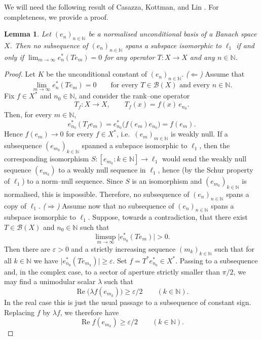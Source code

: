 \documentclass[11pt]{amsart}
\theoremstyle{plain}
\newtheorem{lemma}[theorem]{Lemma}
\theoremstyle{definition}
\numberwithin{equation}{section}
\newcommand{\N}{\mathbb{N}}
\renewcommand{\ge}{\geqslant}
\begin{document}
We will need the following result of Casazza, Kottman, and Lin \cite[Lemma 2]{CKL1976}. For completeness, we provide a proof.

\begin{lemma}\label{lmm: sym-basis-affected}
    Let $(e_n)_{n \in \N}$ be a normalised unconditional basis of a Banach space $X$. Then no subsequence of $(e_n)_{n \in \N}$ spans a subspace isomorphic to $\ell_1$ if and only if $\lim_{m \to \infty} e_n^* (Te_m) = 0$  for any operator $T \colon  X \to X$ and any $n \in \N$.
\end{lemma}
\begin{proof}
Let $K$ be the unconditional constant of $(e_n)_{n\in\N}$.
    \medskip
\noindent\emph{($\Leftarrow$)} Assume that
\[
    \lim_{m\to\infty} e_n^*(T e_m)=0
    \qquad\text{for every }T\in\mathcal B(X)\text{ and every }n\in\N.
\]
Fix $f\in X^*$ and $n_0\in\N$, and consider the rank--one operator
\[
    T_f \colon X\to X, \qquad T_f(x)= f(x)\,e_{n_0}.
\]
Then, for every $m\in\N$,
\[
    e_{n_0}^*(T_f e_m)= e_{n_0}^*\bigl(f(e_m)e_{n_0}\bigr)= f(e_m).
\]
Hence $f(e_m)\to 0$ for every $f\in X^*$, i.e.\ $(e_m)_{m \in \N}$ is weakly null. If a subsequence $(e_{m_k})_{k \in \N}$ spanned a subspace isomorphic to $\ell_1$, then the corresponding isomorphism $S\colon [e_{m_k}: k \in \N] \to \ell_1$ would send the weakly
null sequence $(e_{m_k})$ to a weakly null sequence in $\ell_1$, hence (by the
Schur property of $\ell_1$) to a norm--null sequence. Since $S$ is an
isomorphism and $(e_{m_k})_{k \in \N}$ is normalised, this is impossible. Therefore, no
subsequence of $(e_n)_{n \in \N}$ spans a copy of $\ell_1$.
\medskip
\noindent\emph{($\Rightarrow$)} Assume now that no subsequence of $(e_n)_{n \in \N}$ spans
a subspace isomorphic to $\ell_1$. Suppose, towards a contradiction, that there
exist $T\in\mathcal B(X)$ and $n_0\in\N$ such that
\[
    \limsup_{m\to\infty}\bigl|e_{n_0}^*(T e_m)\bigr|>0.
\]
Then there are $\varepsilon>0$ and a strictly increasing sequence $(m_k)_{k \in \N}$ such
that for all $k\in\N$ we have
\(
    \bigl|e_{n_0}^*(T e_{m_k})\bigr|\ge \varepsilon.
\)
Set $f=T^*e_{n_0}^*\in X^*$. Passing to a subsequence and, in the complex case, to a sector of aperture strictly smaller than $\pi/2$, we may find a unimodular scalar $\lambda$ such that
\[
    \operatorname{Re}\bigl(\lambda f(e_{m_k})\bigr)\ge \varepsilon/2
    \qquad(k\in\N).
\]
In the real case this is just the usual passage to a subsequence of constant sign. Replacing $f$ by $\lambda f$, we therefore have
\[
    \operatorname{Re} f(e_{m_k})\ge \varepsilon/2
    \qquad(k\in\N).
\]
\end{proof}
\end{document}

